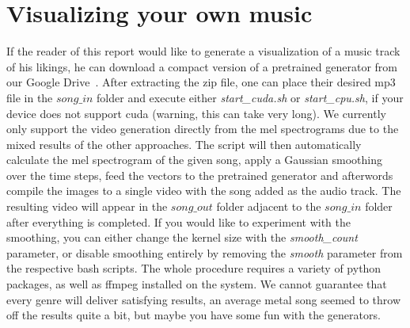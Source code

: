         \section{Visualizing your own music}
            If the reader of this report would like to generate a visualization of a music track of his likings, he can download a compact version of a pretrained generator from our Google Drive~\cite{visualizer}. After extracting the zip file, one can place their desired mp3 file in the $song\_in$ folder and execute either \textit{start\_cuda.sh} or \textit{start\_cpu.sh}, if your device does not support cuda (warning, this can take very long). We currently only support the video generation directly from the mel spectrograms due to the mixed results of the other approaches. The script will then automatically calculate the mel spectrogram of the given song, apply a Gaussian smoothing over the time steps, feed the vectors to the pretrained generator and afterwords compile the images to a single video with the song added as the audio track. The resulting video will appear in the $song\_out$ folder adjacent to the $song\_in$ folder after everything is completed. If you would like to experiment with the smoothing, you can either change the kernel size with the \textit{smooth\_count} parameter, or disable smoothing entirely by removing the \textit{smooth} parameter from the respective bash scripts. The whole procedure requires a variety of python packages, as well as ffmpeg installed on the system. We cannot guarantee that every genre will deliver satisfying results, an average metal song seemed to throw off the results quite a bit, but maybe you have some fun with the generators.
